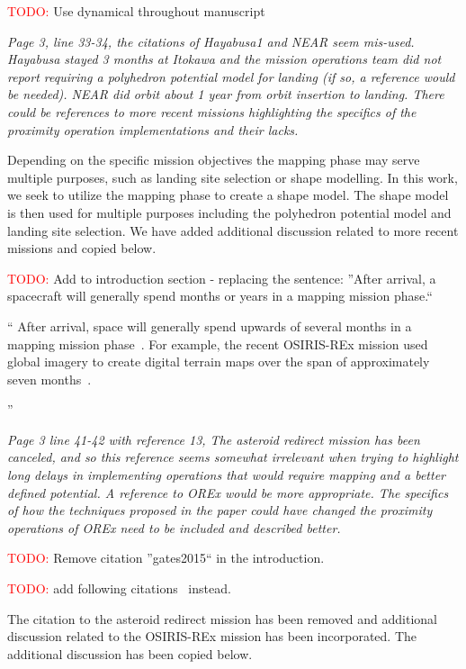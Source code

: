 \documentclass[11pt]{article}
\newcommand{\todo}{{\large \textcolor{red}{TODO: }}}
\newenvironment{correction}{\begin{list}{}{\setlength{\leftmargin}{1cm}\setlength{\rightmargin}{1cm}}\vspace{\parsep}\item[]``}{''\end{list}}
\newcommand{\comment}[1]{\item \itshape #1 \normalfont}
\begin{document}
\begin{itemize}
\todo Use dynamical throughout manuscript

\comment{
Page 3, line 33-34, the citations of Hayabusa1 and NEAR seem mis-used. Hayabusa stayed 3 months at Itokawa and the mission operations team did not report requiring a polyhedron potential model for landing (if so, a reference would be needed). 
NEAR did orbit about 1 year from orbit insertion to landing.
There could be references to more recent missions highlighting the specifics of the proximity operation implementations and their lacks.
}

Depending on the specific mission objectives the mapping phase may serve multiple purposes, such as landing site selection or shape modelling.
In this work, we seek to utilize the mapping phase to create a shape model.
The shape model is then used for multiple purposes including the polyhedron potential model and landing site selection.
We have added additional discussion related to more recent missions and copied below.

\todo Add to introduction section - replacing the sentence: ''After arrival, a spacecraft will generally spend months or years in a mapping mission phase.``
\begin{correction}
After arrival, space will generally spend upwards of several months in a mapping mission phase~\cite{williams2018,kubota2003,cole1998}.
For example, the recent OSIRIS-REx mission used global imagery to create digital terrain maps over the span of approximately seven months~\cite{williams2018}.

\end{correction}


\comment{
Page 3 line 41-42 with reference 13, The asteroid redirect mission has been canceled, and so this reference seems somewhat irrelevant when trying to highlight long delays in implementing operations that would require mapping and a better defined potential.
A reference to OREx would be more appropriate.
The specifics of how the techniques proposed in the paper could have changed the proximity operations of OREx need to be included and described better.
}

\todo Remove citation ''gates2015`` in the introduction. 

\todo add following citations~\cite{williams2018} instead.

The citation to the asteroid redirect mission has been removed and additional discussion related to the OSIRIS-REx mission has been incorporated.
The additional discussion has been copied below.


\end{itemize}
\end{document}
